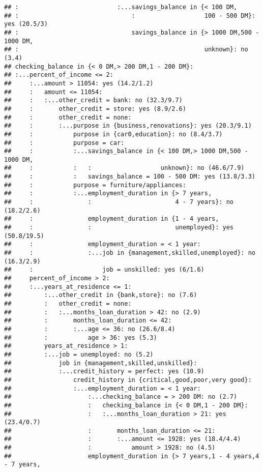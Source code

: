\documentclass[
]{article}
\begin{document}
\begin{verbatim}
## :                           :...savings_balance in {< 100 DM,
## :                               :                   100 - 500 DM}: yes (20.5/3)
## :                               savings_balance in {> 1000 DM,500 - 1000 DM,
## :                                                   unknown}: no (3.4)
## checking_balance in {< 0 DM,> 200 DM,1 - 200 DM}:
## :...percent_of_income <= 2:
##     :...amount > 11054: yes (14.2/1.2)
##     :   amount <= 11054:
##     :   :...other_credit = bank: no (32.3/9.7)
##     :       other_credit = store: yes (8.9/2.6)
##     :       other_credit = none:
##     :       :...purpose in {business,renovations}: yes (20.3/9.1)
##     :           purpose in {car0,education}: no (8.4/3.7)
##     :           purpose = car:
##     :           :...savings_balance in {< 100 DM,> 1000 DM,500 - 1000 DM,
##     :           :   :                   unknown}: no (46.6/7.9)
##     :           :   savings_balance = 100 - 500 DM: yes (13.8/3.3)
##     :           purpose = furniture/appliances:
##     :           :...employment_duration in {> 7 years,
##     :               :                       4 - 7 years}: no (18.2/2.6)
##     :               employment_duration in {1 - 4 years,
##     :               :                       unemployed}: yes (50.8/19.5)
##     :               employment_duration = < 1 year:
##     :               :...job in {management,skilled,unemployed}: no (16.3/2.9)
##     :                   job = unskilled: yes (6/1.6)
##     percent_of_income > 2:
##     :...years_at_residence <= 1:
##         :...other_credit in {bank,store}: no (7.6)
##         :   other_credit = none:
##         :   :...months_loan_duration > 42: no (2.9)
##         :       months_loan_duration <= 42:
##         :       :...age <= 36: no (26.6/8.4)
##         :           age > 36: yes (5.3)
##         years_at_residence > 1:
##         :...job = unemployed: no (5.2)
##             job in {management,skilled,unskilled}:
##             :...credit_history = perfect: yes (10.9)
##                 credit_history in {critical,good,poor,very good}:
##                 :...employment_duration = < 1 year:
##                     :...checking_balance = > 200 DM: no (2.7)
##                     :   checking_balance in {< 0 DM,1 - 200 DM}:
##                     :   :...months_loan_duration > 21: yes (23.4/0.7)
##                     :       months_loan_duration <= 21:
##                     :       :...amount <= 1928: yes (18.4/4.4)
##                     :           amount > 1928: no (4.5)
##                     employment_duration in {> 7 years,1 - 4 years,4 - 7 years,

\end{verbatim}
\end{document}
